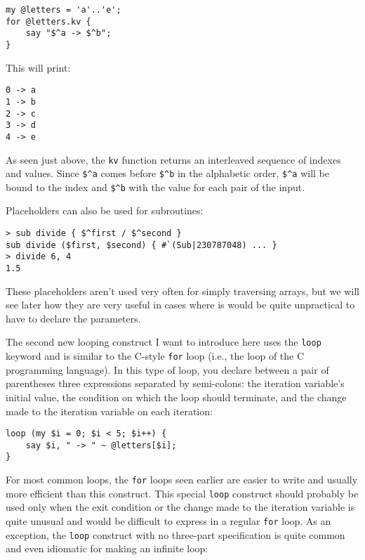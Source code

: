 \begin{verbatim}
my @letters = 'a'..'e';
for @letters.kv { 
    say "$^a -> $^b"; 
}
\end{verbatim}
%
This will print:
\begin{verbatim}
0 -> a
1 -> b
2 -> c
3 -> d
4 -> e
\end{verbatim}
%

As seen just above, the {\tt kv} function returns an 
interleaved sequence of indexes and values. Since 
\verb'$^a' comes before \verb'$^b' in the alphabetic 
order, \verb'$^a' will be bound to the index and 
\verb'$^b' with the value for each pair of the input.

Placeholders can also be used for subroutines:

\begin{verbatim}
> sub divide { $^first / $^second }
sub divide ($first, $second) { #`(Sub|230787048) ... }
> divide 6, 4
1.5
\end{verbatim}
%

These placeholders aren't used very often for 
simply traversing arrays, but we will see later how  
they are very useful in cases where is would be quite 
unpractical to have to declare the parameters.

\label{C-style loop}
The second new looping construct I want to introduce 
here uses the {\tt loop} keyword and is similar to 
the C-style {\tt for} loop (i.e., the loop of the 
C programming language). In this type of loop, you 
declare between a pair of parentheses three expressions 
separated by semi-colons: the iteration variable's 
initial value, the condition on which the loop should 
terminate, and the change made to the iteration variable on 
each iteration:

\begin{verbatim}
loop (my $i = 0; $i < 5; $i++) {
    say $i, " -> " ~ @letters[$i];
}
\end{verbatim}
%
For most common loops, the {\tt for} loops seen earlier 
are easier to write and usually more efficient than this 
construct. This special {\tt loop} construct should probably 
be used only when the exit condition or the change made to 
the iteration variable is quite unusual and would 
be difficult to express in a regular {\tt for} loop. As 
an exception, the {\tt loop} construct with no 
three-part specification is quite common and even 
idiomatic for making an infinite loop:

